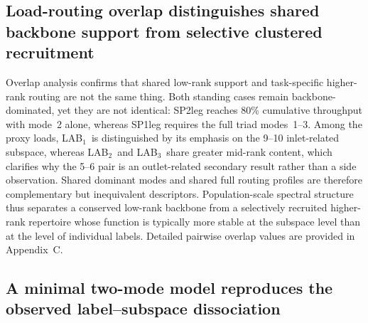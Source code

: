 \documentclass[11pt]{article}
\newcommand{\LABone}{LAB$_1$}
\newcommand{\LABtwo}{LAB$_2$}
\newcommand{\LABthree}{LAB$_3$}
\newcommand{\StdTableFont}{\footnotesize}
\newcommand{\StdTableInput}[1]{%
  \begingroup
  \setlength{\tabcolsep}{4pt}%
  \resizebox{\linewidth}{!}{}%
  \endgroup
}
\begin{document}
\begin{table}[!htbp]
\centering
\caption{\textbf{Dominant mode sets for the standing and proxy loading cases.}
$N_{80}$ denotes the smallest set of modes required to reach 80\% cumulative mean energy fraction.}
\label{tab:dominant-sets}
\StdTableFont
\StdTableInput{../../analysis_outputs/tables/mode_activation_dominant_sets.tex}
\end{table}

\subsection{Load-routing overlap distinguishes shared backbone support from selective clustered recruitment}
\label{sec:overlap-results}

Overlap analysis confirms that shared low-rank support and task-specific higher-rank routing are not the same thing.
Both standing cases remain backbone-dominated, yet they are not identical: SP2leg reaches 80\% cumulative throughput with mode~2 alone, whereas SP1leg requires the full triad modes~1--3.
Among the proxy loads, \LABone\ is distinguished by its emphasis on the 9--10 inlet-related subspace, whereas \LABtwo\ and \LABthree\ share greater mid-rank content, which clarifies why the 5--6 pair is an outlet-related secondary result rather than a side observation.
Shared dominant modes and shared full routing profiles are therefore complementary but inequivalent descriptors.
Population-scale spectral structure thus separates a conserved low-rank backbone from a selectively recruited higher-rank repertoire whose function is typically more stable at the subspace level than at the level of individual labels.
Detailed pairwise overlap values are provided in Appendix~C.

\subsection{A minimal two-mode model reproduces the observed label--subspace dissociation}
\label{sec:toy-results}
\end{document}
